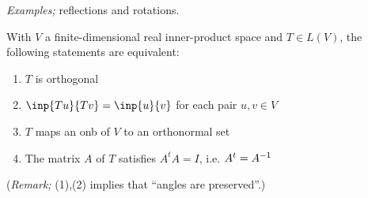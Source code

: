\emph{Examples;} reflections and rotations.


\begin{theorem}
  With $V$ a finite-dimensional real inner-product space and $T\in L(V)$, the following statements are equivalent:
  \begin{enumerate}[(1)]
    \item $T$ is orthogonal
    \item $\inp{Tu}{Tv}=\inp{u}{v}$ for each pair $u,v\in V$
    \item $T$ maps an onb of $V$ to an orthonormal set
    \item The matrix $A$ of $T$ satisfies $A^tA=I$, i.e. $A^t=A^{-1}$
  \end{enumerate}
\end{theorem}
(\emph{Remark;} (1),(2) implies that ``angles are preserved''.)
